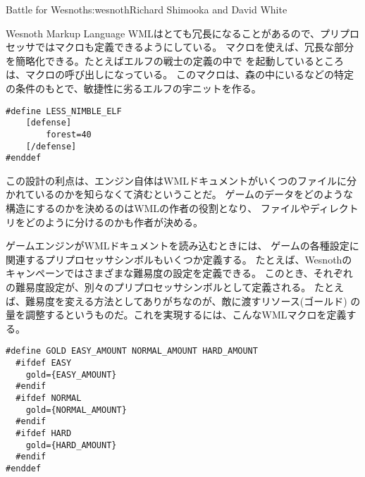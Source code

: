 \begin{aosachapter}{Battle for Wesnoth}{s:wesnoth}{Richard Shimooka and David White}
\begin{aosasect1}{Wesnoth Markup Language}
WMLはとても冗長になることがあるので、プリプロセッサではマクロも定義できるようにしている。
マクロを使えば、冗長な部分を簡略化できる。たとえばエルフの戦士の定義の中で
を起動しているところは、マクロの呼び出しになっている。
このマクロは、森の中にいるなどの特定の条件のもとで、敏捷性に劣るエルフの宇ニットを作る。

\begin{verbatim}
#define LESS_NIMBLE_ELF
    [defense]
        forest=40
    [/defense]
#enddef
\end{verbatim}

この設計の利点は、エンジン自体はWMLドキュメントがいくつのファイルに分かれているのかを知らなくて済むということだ。
ゲームのデータをどのような構造にするのかを決めるのはWMLの作者の役割となり、
ファイルやディレクトリをどのように分けるのかも作者が決める。

ゲームエンジンがWMLドキュメントを読み込むときには、
ゲームの各種設定に関連するプリプロセッサシンボルもいくつか定義する。
たとえば、Wesnothのキャンペーンではさまざまな難易度の設定を定義できる。
このとき、それぞれの難易度設定が、別々のプリプロセッサシンボルとして定義される。
たとえば、難易度を変える方法としてありがちなのが、敵に渡すリソース(ゴールド)
の量を調整するというものだ。これを実現するには、こんなWMLマクロを定義する。

\begin{verbatim}
#define GOLD EASY_AMOUNT NORMAL_AMOUNT HARD_AMOUNT
  #ifdef EASY
    gold={EASY_AMOUNT}
  #endif
  #ifdef NORMAL
    gold={NORMAL_AMOUNT}
  #endif
  #ifdef HARD
    gold={HARD_AMOUNT}
  #endif
#enddef
\end{verbatim}


\end{aosasect1}
\end{aosachapter}
